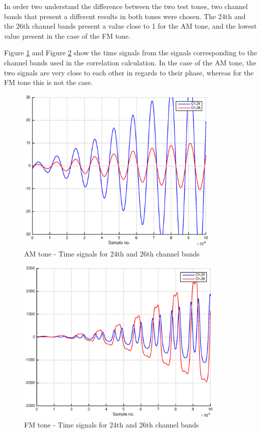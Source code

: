 \documentclass[a4paper]{article}
\begin{document}
In order two understand the difference between the two test tones, two channel
bands that present a different results in both tones were chosen. The 24th and
the 26th channel bands present a value close to 1 for the AM tone, and the
lowest value present in the case of the FM tone.

Figure \ref{fig:am2426} and Figure \ref{fig:fm2425} show the time signals from
the signals corresponding to the channel bands used in the correlation
calculation. In the case of the AM tone, the two signals are very close to each
other in regards to their phase, whereas for the FM tone this is not the case.

\begin{figure}[ht]
    \centering
    \includegraphics[height=8cm]{img/model_excitation_AM_24_26}
    \caption{AM tone - Time signals for 24th and 26th channel bands}
    \label{fig:am2426}
\end{figure}

\begin{figure}[ht]
    \centering
    \includegraphics[height=8cm]{img/model_excitation_FM_24_26}
    \caption{FM tone - Time signals for 24th and 26th channel bands}
    \label{fig:fm2425}
\end{figure}
\end{document}
